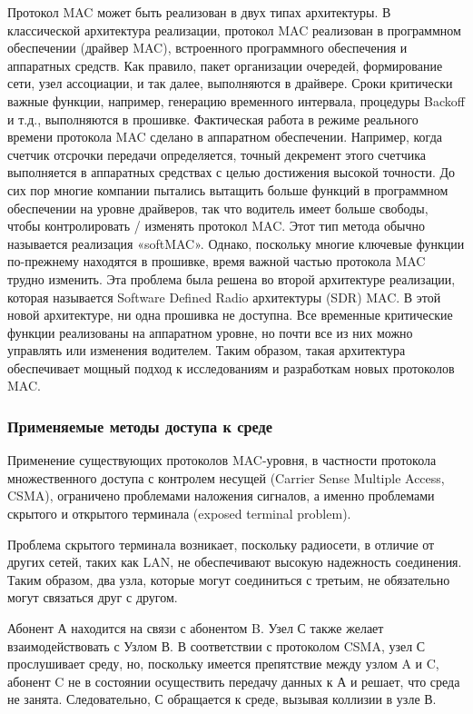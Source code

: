 \documentclass[14pt,a4paper,titlepage]{extarticle}
\begin{document}
Протокол MAC может быть реализован в двух типах архитектуры. В классической архитектура реализации, протокол MAC реализован в программном обеспечении (драйвер MAC), встроенного программного обеспечения и аппаратных средств. Как правило, пакет организации очередей, формирование сети, узел ассоциации, и так далее, выполняются в драйвере. Сроки критически важные функции, например, генерацию временного интервала, процедуры Backoff и т.д., выполняются в прошивке. Фактическая работа в режиме реального времени протокола MAC сделано в аппаратном обеспечении. Например, когда счетчик отсрочки передачи определяется, точный декремент этого счетчика выполняется в аппаратных средствах с целью достижения высокой точности. До сих пор многие компании пытались вытащить больше функций в программном обеспечении на уровне драйверов, так что водитель имеет больше свободы, чтобы контролировать / изменять протокол MAC. Этот тип метода обычно называется реализация «softMAC». Однако, поскольку многие ключевые функции по-прежнему находятся в прошивке, время важной частью протокола MAC трудно изменить. Эта проблема была решена во второй архитектуре реализации, которая называется Software Defined Radio архитектуры (SDR) MAC. В этой новой архитектуре, ни одна прошивка не доступна. Все временные критические функции реализованы на аппаратном уровне, но почти все из них можно управлять или изменения водителем. Таким образом, такая архитектура обеспечивает мощный подход к исследованиям и разработкам новых протоколов MAC.

\subsubsection{Применяемые методы доступа к среде}
Применение существующих протоколов MAC-уровня, в частности протокола множественного доступа с контролем несущей (Carrier Sense Multiple Access, CSMA), ограничено проблемами наложения сигналов, а именно проблемами скрытого и открытого терминала (exposed terminal problem). 

Проблема скрытого терминала возникает, поскольку радиосети, в отличие от других сетей, таких как LAN, не обеспечивают высокую надежность соединения. Таким образом, два узла, которые могут соединиться с третьим, не обязательно могут связаться друг с другом.

Абонент А находится на связи с абонентом B. Узел С также желает взаимодействовать с Узлом В. В соответствии с протоколом CSMA, узел С прослушивает среду, но, поскольку имеется препятствие между узлом A и C, абонент C не в состоянии осуществить передачу данных к А и решает, что среда не занята. Следовательно, С обращается к среде, вызывая коллизии в узле В.
\end{document}
